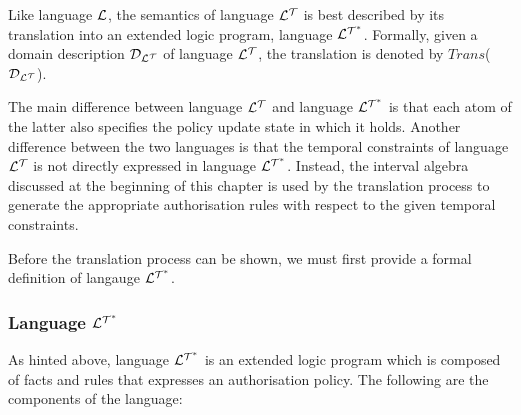 \documentclass[11pt]{report}
\begin{document}
        Like language ${\cal L}$, the semantics of language ${\cal L^T}$ is
        best described by its translation into an extended logic program,
        language ${\cal L^{T^*}}$. Formally, given a domain description
        ${\cal D_{L^T}}$ of language ${\cal L^T}$, the translation is denoted
        by $Trans$(${\cal D_{L^T}}$).

        The main difference between language ${\cal L^T}$ and language
        ${\cal L^{T^*}}$ is that each atom of the latter also specifies the
        policy update state in which it holds. Another difference between the
        two languages is that the temporal constraints of language ${\cal L^T}$
        is not directly expressed in language ${\cal L^{T^*}}$. Instead, the
        interval algebra discussed at the beginning of this chapter is used by
        the translation process to generate the appropriate authorisation rules
        with respect to the given temporal constraints.

        Before the translation process can be shown, we must first provide
        a formal definition of langauge ${\cal L^{T^*}}$.

        \subsubsection{Language ${\cal L^{T^*}}$}

          As hinted above, language ${\cal L^{T^*}}$ is an extended logic
          program which is composed of facts and rules that expresses an
          authorisation policy. The following are the components of the
          language:
\end{document}
